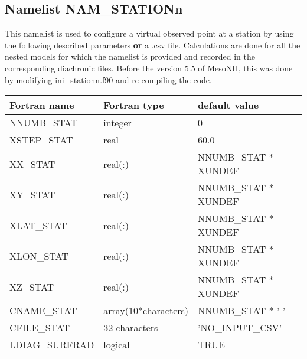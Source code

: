 \subsection{Namelist NAM\_STATIONn }\label{s:namstationn}
%
This namelist is used to configure a virtual observed point at a station by using the following described parameters \textbf{or} a .csv file. Calculations are done for all the nested models for which the namelist is provided and recorded in the corresponding diachronic files. Before the version 5.5 of MesoNH, this was done by modifying ini\_stationn.f90 and re-compiling the code.

\vspace{0.5cm}
\begin{longtable} {|p{}|p{}|p{}|}
\hline
Fortran name &  Fortran type & default value \\
\hline 
\endhead
\hline
\endfoot
NNUMB\_STAT    & integer &  0 \\
XSTEP\_STAT    & real  &  60.0 \\
XX\_STAT       & real(:)  &  NNUMB\_STAT * XUNDEF \\
XY\_STAT       & real(:)  &  NNUMB\_STAT * XUNDEF  \\
XLAT\_STAT     & real(:)  &  NNUMB\_STAT * XUNDEF \\
XLON\_STAT     & real(:)  &  NNUMB\_STAT * XUNDEF \\
XZ\_STAT       & real(:)  &  NNUMB\_STAT * XUNDEF \\
CNAME\_STAT    & array(10*characters)  &  NNUMB\_STAT * ' ' \\
CFILE\_STAT    & 32 characters  &  'NO\_INPUT\_CSV' \\
LDIAG\_SURFRAD & logical & TRUE \\
\end{longtable}
